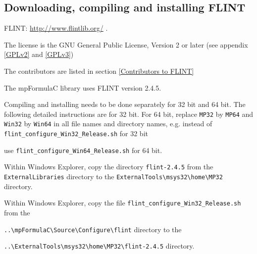 \newpage
\subsection{Downloading, compiling and installing FLINT}

FLINT: \href{http://www.flintlib.org/}{http://www.flintlib.org/} . 

\vpara
The license is the GNU General Public License, Version 2 or later (see appendix \ref{GPLv2} and \ref{GPLv3})

\vpara
The contributors are listed in section \ref{Contributors to FLINT}

\vpara
The  mpFormulaC library uses FLINT version 2.4.5.



\vpara
Compiling and installing needs to be done separately for 32 bit and 64 bit. The following detailed instructions are for 32 bit. For 64 bit, replace \verb|MP32| by \verb|MP64| and \verb|Win32| by  \verb|Win64| in all file names and directory names, e.g. instead of \verb|flint_configure_Win32_Release.sh| for 32 bit

use \verb|flint_configure_Win64_Release.sh| for 64 bit.

\vpara
Within Windows Explorer, copy the directory \verb|flint-2.4.5|  from the \verb|ExternalLibraries|
directory to the \verb|ExternalTools\msys32\home\MP32| directory. 

\vpara
Within Windows Explorer, copy the file \verb|flint_configure_Win32_Release.sh|  from the

\verb|..\mpFormulaC\Source\Configure\flint| directory to the 

\verb|..\ExternalTools\msys32\home\MP32\flint-2.4.5| directory.  


